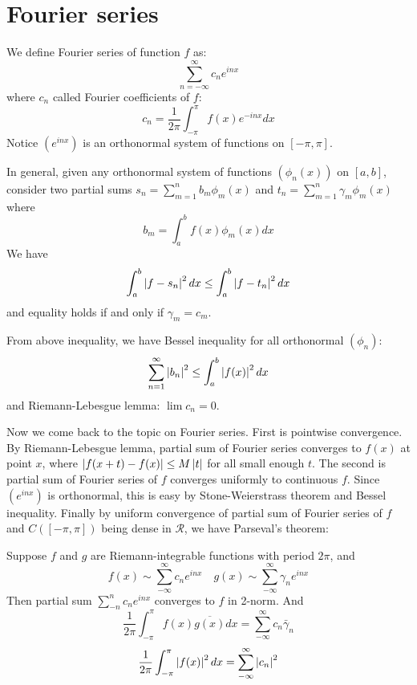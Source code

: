 \section{Fourier series}
We define Fourier series of function $f$ as:
\begin{equation*}
    \sum_{n=-\infty}^\infty c_ne^{in x}
\end{equation*}
where $c_n$ called Fourier coefficients of $f$:
\begin{equation*}
    c_n=\frac{1}{2\pi}\int_{-\pi}^{\pi}f(x)e^{-in x}dx
\end{equation*}
Notice $(e^{inx})$ is an orthonormal system of functions on $[-\pi,\pi]$.\par 
In general, given any orthonormal system of functions $(\phi_n(x))$ on $[a,b]$, consider two partial sums $s_n=\sum_{m=1}^n b_m \phi_m(x)$ and $t_n=\sum_{m=1}^n \gamma_m \phi_m(x)$ where 
\begin{equation*}
    b_m=\int_{a}^{b}f(x)\phi_m(x)dx
\end{equation*}
We have 
\begin{equation*}
    \int_{a}^{b}\left\lvert f-s_n\right\rvert^2dx\leq\int_{a}^{b}\left\lvert f-t_n\right\rvert^2dx
\end{equation*}
and equality holds if and only if $\gamma_m=c_m$.\par
From above inequality, we have Bessel inequality for all orthonormal $(\phi_n)$:
\begin{equation*}
    \sum_{n=1}^\infty\left\lvert b_n\right\rvert^2\leq \int_{a}^{b}\left\lvert f(x)\right\rvert^2 dx
\end{equation*}
and Riemann-Lebesgue lemma: $\lim c_n=0$.\par
Now we come back to the topic on Fourier series. First is pointwise convergence. By Riemann-Lebesgue lemma, partial sum of Fourier series converges to $f(x)$ at point $x$, where $\left\lvert f(x+t)-f(x)\right\rvert\leq M\left\lvert t\right\rvert$ for all small enough $t$. The second is partial sum of Fourier series of $f$ converges uniformly to continuous $f$. Since $(e^{inx})$ is orthonormal, this is easy by Stone-Weierstrass theorem and Bessel inequality. Finally by uniform convergence of partial sum of Fourier series of $f$ and $C([-\pi,\pi])$ being dense in $\mathscr{R}$, we have Parseval's theorem:
\begin{theorem}
    Suppose $f$ and $g$ are Riemann-integrable functions with period $2\pi$, and 
    \begin{equation*}
        f(x)\sim \sum_{-\infty}^\infty c_n e^{inx}\quad  g(x)\sim \sum_{-\infty}^\infty \gamma_n e^{inx}
    \end{equation*}
    Then partial sum $\sum_{-n}^n c_n e^{inx}$ converges to $f$ in 2-norm. And
    \begin{equation*}
        \frac{1}{2\pi}\int_{-\pi}^{\pi}f(x)\overline{g(x)}dx=\sum_{-\infty}^\infty c_n\bar{\gamma}_n
    \end{equation*}
    \begin{equation*}
        \frac{1}{2\pi}\int_{-\pi}^{\pi}\left\lvert f(x)\right\rvert^2dx=\sum_{-\infty}^\infty \left\lvert c_n\right\rvert^2
    \end{equation*}
\end{theorem}
